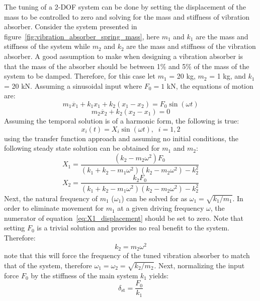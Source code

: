 \documentclass[12pt,letter]{article}
\numberwithin{ex}{section} %
\numberwithin{re}{section} %
\numberwithin{vcs}{section} %
\begin{document}
The tuning of a 2-DOF system can be done by setting the displacement of the mass to be controlled to zero and solving for the mass and stiffness of vibration absorber. Consider the system presented in figure~\ref{fig:vibration_absorber_spring_mass}, here $m_1$ and $k_1$ are the mass and stiffness of the system while $m_2$ and $k_2$ are the mass and stiffness of the vibration absorber. A good assumption to make when designing a vibration absorber is that the mass of the absorber should be between 1\% and 5\% of the mass of the system to be damped. Therefore, for this case let $m_1$ = 20 kg, $m_2$ = 1 kg, and $k_1$ = 20 kN. Assuming a sinusoidal input where $F_0 = 1$ kN, the equations of motion are:
\begin{equation}
m_1\ddot{x_1} + k_1 x_1 + k_2(x_1-x_2)  = F_0 \sin (\omega t)
\end{equation}
\begin{equation}
m_2\ddot{x_2} + k_2(x_2-x_1) = 0
\end{equation}
Assuming the temporal solution is of a harmonic form, the following is true:
\begin{equation}
x_i(t) = X_i \sin (\omega t ), \; \; i=1,2
\end{equation}
using the transfer function approach and assuming no initial conditions, the following steady state solution can be obtained for $m_1$ and $m_2$:
\begin{equation}
X_1 = \frac{(k_2 - m_2 \omega^2)F_0}{(k_1+k_2-m_1 \omega^2)(k_2-m_2 \omega^2) -k_2^2}
\label{eq:X1_displacement}
\end{equation}
\begin{equation}
X_2 = \frac{k_2 F_0}{(k_1+k_2-m_1 \omega^2)(k_2-m_2 \omega^2) -k_2^2}
\label{eq:X2_displacement}
\end{equation}
Next, the natural frequency of $m_1$ ($\omega_1$) can be solved for as $\omega_1=\sqrt{k_1 / m_1}$. In order to eliminate movement for $m_1$ at a given driving frequency $\omega$, the numerator of equation~\ref{eq:X1_displacement} should be set to zero. Note that setting $F_0$ is a trivial solution and provides no real benefit to the system. Therefore:
\begin{equation}
k_2 = m_2 \omega^2
\end{equation}
note that this will force the frequency of the tuned vibration absorber to match that of the system, therefore $\omega_1 = \omega_2 = \sqrt{k_2 / m_2}$. Next, normalizing the input force $F_0$ by the stiffness of the main system $k_1$ yields:
\begin{equation}
\delta_{\text{st}} = \frac{F_0}{k_1}
\end{equation}
\end{document}
